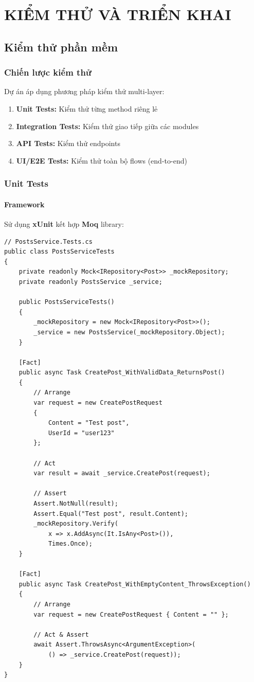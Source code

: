 \chapter{KIỂM THỬ VÀ TRIỂN KHAI}

\section{Kiểm thử phần mềm}

\subsection{Chiến lược kiểm thử}
Dự án áp dụng phương pháp kiểm thử multi-layer:

\begin{enumerate}
    \item \textbf{Unit Tests:} Kiểm thử từng method riêng lẻ
    \item \textbf{Integration Tests:} Kiểm thử giao tiếp giữa các modules
    \item \textbf{API Tests:} Kiểm thử endpoints
    \item \textbf{UI/E2E Tests:} Kiểm thử toàn bộ flows (end-to-end)
\end{enumerate}

\subsection{Unit Tests}

\subsubsection{Framework}
Sử dụng \textbf{xUnit} kết hợp \textbf{Moq} library:

\begin{verbatim}
// PostsService.Tests.cs
public class PostsServiceTests
{
    private readonly Mock<IRepository<Post>> _mockRepository;
    private readonly PostsService _service;
    
    public PostsServiceTests()
    {
        _mockRepository = new Mock<IRepository<Post>>();
        _service = new PostsService(_mockRepository.Object);
    }
    
    [Fact]
    public async Task CreatePost_WithValidData_ReturnsPost()
    {
        // Arrange
        var request = new CreatePostRequest 
        { 
            Content = "Test post",
            UserId = "user123"
        };
        
        // Act
        var result = await _service.CreatePost(request);
        
        // Assert
        Assert.NotNull(result);
        Assert.Equal("Test post", result.Content);
        _mockRepository.Verify(
            x => x.AddAsync(It.IsAny<Post>()), 
            Times.Once);
    }
    
    [Fact]
    public async Task CreatePost_WithEmptyContent_ThrowsException()
    {
        // Arrange
        var request = new CreatePostRequest { Content = "" };
        
        // Act & Assert
        await Assert.ThrowsAsync<ArgumentException>(
            () => _service.CreatePost(request));
    }
}
\end{verbatim}

